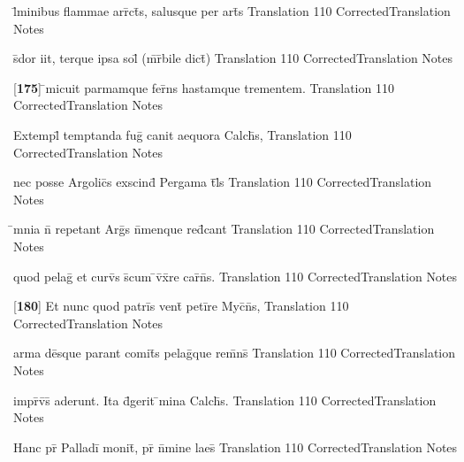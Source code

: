 \latline
  {l\={}minibus flammae arr\={}ct\={\macron {\i}}s, salusque per art\={}s}
  { Translation }
  {110}
  { CorrectedTranslation }
  { Notes }


\latline
  {s\={}dor iit, terque ipsa sol\={} (m\={\macron {\i}}r\={}bile dict\={})}
  { Translation }
  {110}
  { CorrectedTranslation }
  { Notes }


\latline
  {[\textbf{175}] \={}micuit parmamque fer\={}ns hastamque trementem.}
  { Translation }
  {110}
  { CorrectedTranslation }
  { Notes }


\latline
  {Extempl\={} temptanda fug\={} canit aequora Calch\={}s,}
  { Translation }
  {110}
  { CorrectedTranslation }
  { Notes }


\latline
  {nec posse Argolic\={\macron {\i}}s exscind\={\macron {\i}} Pergama t\={}l\={\macron {\i}}s}
  { Translation }
  {110}
  { CorrectedTranslation }
  { Notes }


\latline
  {\={}mnia n\={\macron {\i}} repetant Arg\={\macron {\i}}s n\={}menque red\={}cant}
  { Translation }
  {110}
  { CorrectedTranslation }
  { Notes }


\latline
  {quod pelag\={} et curv\={\macron {\i}}s s\={}cum \={}v\={}x\={}re car\={\macron {\i}}n\={\macron {\i}}s.}
  { Translation }
  {110}
  { CorrectedTranslation }
  { Notes }


\latline
  {[\textbf{180}] Et nunc quod patri\={}s vent\={} peti\={}re Myc\={}n\={}s,}
  { Translation }
  {110}
  { CorrectedTranslation }
  { Notes }


\latline
  {arma de\={}sque parant comit\={}s pelag\={}que rem\={}ns\={}}
  { Translation }
  {110}
  { CorrectedTranslation }
  { Notes }


\latline
  {impr\={}v\={\macron {\i}}s\={\macron {\i}} aderunt.  Ita d\={\macron {\i}}gerit \={}mina Calch\={}s.}
  { Translation }
  {110}
  { CorrectedTranslation }
  { Notes }


\latline
  {Hanc pr\={} Palladi\={} monit\={\macron {\i}}, pr\={} n\={}mine laes\={}}
  { Translation }
  {110}
  { CorrectedTranslation }
  { Notes }


